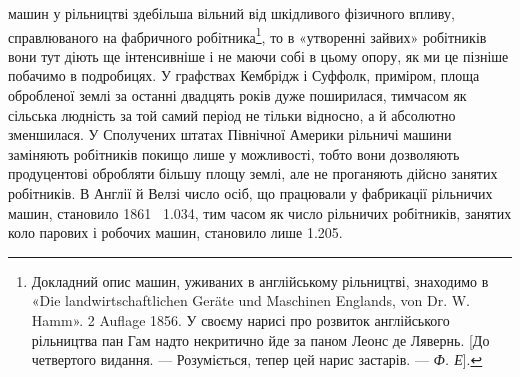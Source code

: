 \parcont{}  %
машин у рільництві здебільша вільний від шкідливого фізичного
впливу, справлюваного на фабричного робітника\footnote{
Докладний опис машин, уживаних в англійському рільництві,
знаходимо в «\textgerman{Die landwirtschaftlichen Geräte und Maschinen Englands,
von Dr. W. Hamm}». 2 Auflage 1856. У своєму нарисі про розвиток англійського
рільництва пан Гам надто некритично йде за паном Леонс де
Лявернь. [До четвертого видання. — Розуміється, тепер цей нарис застарів.
— \emph{Ф. Е}].
},
то в «утворенні зайвих» робітників вони тут діють ще інтенсивніше
і не маючи собі в цьому опору, як ми це пізніше
побачимо в подробицях. У графствах Кембрідж і Суффолк, приміром,
площа обробленої землі за останні двадцять років дуже
поширилася, тимчасом як сільська людність за той самий період
не тільки відносно, а й абсолютно зменшилася. У Сполучених
штатах Північної Америки рільничі машини заміняють робітників
покищо лише у можливості, тобто вони дозволяють продуцентові
обробляти більшу площу землі, але не проганяють дійсно
занятих робітників. В Англії й Велзі число осіб, що працювали
у фабрикації рільничих машин, становило 1861~ \num{1.034}, тим часом
як число рільничих робітників, занятих коло парових і робочих
машин, становило лише \num{1.205}.

